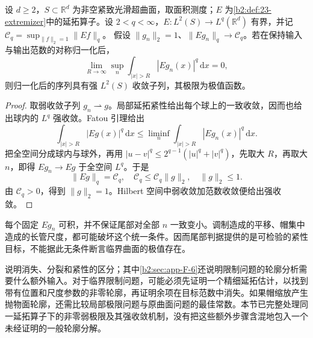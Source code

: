 \begin{proposition}[统一输出尾部判据]\label{b2:prop:23-extremizer-tail}
设 \(d\geq2\)，\(S\subset\mathbb R^d\) 为非空紧致光滑超曲面，取面积测度；\(E\) 为\cref{b2:def:23-extremizer}中的延拓算子。设 \(2<q<\infty\)，\(E:L^2(S)\to L^q(\mathbb R^d)\) 有界，并记
\(\mathcal C_q=\sup_{\|f\|_2=1}\|Ef\|_q\)。
假设 \(\|g_n\|_2=1\)、\(\|Eg_n\|_q\to\mathcal C_q\)。若在保持输入与输出范数的对称归一化后，
\[
 \lim_{R\to\infty}\sup_n\int_{|x|>R}|Eg_n(x)|^q\,\mathrm dx=0,
\]
则归一化后的序列具有强 \(L^2(S)\) 收敛子列，其极限为极值函数。
\end{proposition}
\begin{proof}
取弱收敛子列 \(g_n\rightharpoonup g\)。局部延拓紧性给出每个球上的一致收敛，因而也给出球内的 \(L^q\) 强收敛。Fatou 引理给出
\[
 \int_{|x|>R}|Eg(x)|^q\,\mathrm dx
 \leq\liminf_n\int_{|x|>R}|Eg_n(x)|^q\,\mathrm dx.
\]
把全空间分成球内与球外，再用
\(|u-v|^q\leq2^{q-1}(|u|^q+|v|^q)\)，先取大 \(R\)，再取大 \(n\)，即得 \(Eg_n\to Eg\) 于全空间 \(L^q\)。于是
\[
 \|Eg\|_q=\mathcal C_q,\quad
 \mathcal C_q\leq\mathcal C_q\|g\|_2,\quad
 \|g\|_2\leq1.
\]
由 \(\mathcal C_q>0\)，得到 \(\|g\|_2=1\)。Hilbert 空间中弱收敛加范数收敛便给出强收敛。
\end{proof}

每个固定 \(Eg_n\) 可积，并不保证尾部对全部 \(n\) 一致变小。调制造成的平移、帽集中造成的长管尺度，都可能破坏这个统一条件。因而尾部判据提供的是可检验的紧性目标，不能据此无条件断言临界曲面的极值存在。

\ProseParagraphBreak
{}说明消失、分裂和紧性的区分；其中\cref{b2:sec:app-F-6}还说明限制问题的轮廓分析需要什么额外输入。对于临界限制问题，可能必须先证明一个精细延拓估计，以找到带有位置和尺度参数的非零轮廓，再证明余项在目标范数中消失。如果帽缩放产生抛物面轮廓，还需比较局部极限问题与原曲面问题的最佳常数。本节已完整处理同一延拓算子下的非零弱极限及其强收敛机制，没有把这些额外步骤含混地包入一个未经证明的一般轮廓分解。

